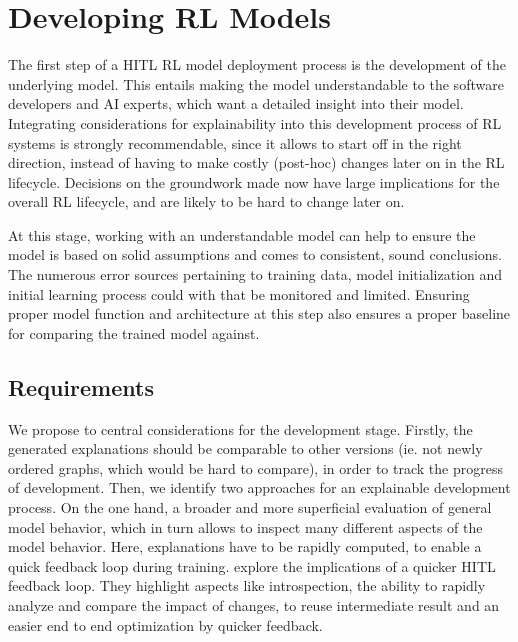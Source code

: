 \documentclass[twoside,11pt]{article}
\begin{document}
\section{Developing RL Models}

    
    

The first step of a HITL RL model deployment process is the development of the underlying model. This entails making the model understandable to the software developers and AI experts, which want a detailed insight into their model. 
Integrating considerations for explainability into this development process of RL systems is strongly recommendable, since it allows to start off in the right direction, instead of having to make costly (post-hoc) changes later on in the RL lifecycle. Decisions on the groundwork made now have large implications for the overall RL lifecycle, and are likely to be hard to change later on.

At this stage, working with an understandable model can help to ensure the model is based on solid assumptions and comes to consistent, sound conclusions. The numerous error sources pertaining to training data, model initialization and initial learning process could with that be monitored and limited.
Ensuring proper model function and architecture at this step also ensures a proper baseline for comparing the trained model against.

\subsection{Requirements}
We propose to central considerations for the development stage. Firstly, the generated explanations should be comparable to other versions (ie. not newly ordered graphs, which would be hard to compare), in order to track the progress of development. 
Then, we identify two approaches for an explainable development process. On the one hand, a broader and more superficial evaluation of general model behavior, which in turn allows to inspect many different aspects of the model behavior. Here, explanations have to be rapidly computed, to enable a quick feedback loop during training. 
\citet{XinEtAl:2018:HITLMLFeedbackLoop} explore the implications of a quicker HITL feedback loop. They highlight aspects like introspection, the ability to rapidly analyze and compare the impact of changes, to reuse intermediate result and an easier end to end optimization by quicker feedback.
\end{document}
